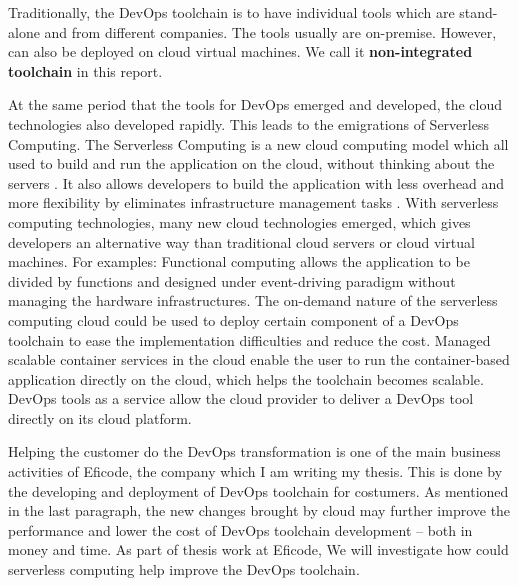 \par
Traditionally, the DevOps toolchain is to have individual tools which are stand-alone and from different companies. The tools usually are on-premise. However, can also be deployed on cloud virtual machines. We call it
\textbf{non-integrated toolchain} in this report.
\par
At the same period that the tools for DevOps emerged and developed, the cloud technologies also developed rapidly. This leads to the emigrations of Serverless Computing. 
The Serverless Computing is a new cloud computing model which all used to build and run the application on the cloud, without thinking about the servers \cite{Serverle81:online}. It also allows developers to build the application with less overhead \cite{Serverle81:online} and more flexibility by eliminates infrastructure management tasks \cite{Serverle73:online}.
With serverless computing technologies, many new cloud technologies emerged, which gives developers an alternative way than traditional cloud servers or cloud virtual machines. For examples: Functional computing allows the application to be divided by functions and designed under event-driving paradigm without managing the hardware infrastructures. The on-demand nature of the serverless computing cloud could be used to deploy certain component of a DevOps toolchain to ease the implementation difficulties and reduce the cost. Managed scalable container services in the cloud enable the user to run the container-based application directly on the cloud, which helps the toolchain becomes scalable. DevOps tools as a service \cite{DevOpsas45:online} allow the cloud provider to deliver a DevOps tool directly on its cloud platform.
\par
Helping the customer do the DevOps transformation is one of the main business activities of Eficode, the company which I am writing my thesis. This is done by the developing and deployment of DevOps toolchain for costumers. As mentioned in the last paragraph, the new changes brought by cloud may further improve the performance and lower the cost of DevOps toolchain development -- both in money and time. As part of thesis work at Eficode, We will investigate how could serverless computing help improve the DevOps toolchain. 
